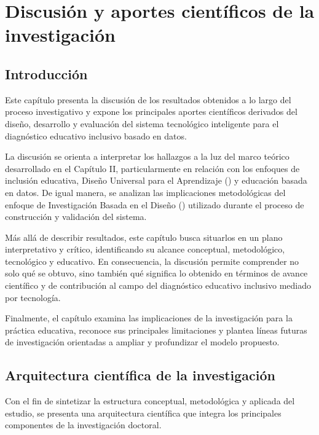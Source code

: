 \chapter{Discusión y aportes científicos de la investigación}

\begin{refsection}

\section{Introducción}

Este capítulo presenta la discusión de los resultados obtenidos a lo largo del proceso investigativo y expone los principales aportes científicos derivados del diseño, desarrollo y evaluación del sistema tecnológico inteligente para el diagnóstico educativo inclusivo basado en datos.

La discusión se orienta a interpretar los hallazgos a la luz del marco teórico desarrollado en el Capítulo II, particularmente en relación con los enfoques de inclusión educativa, Diseño Universal para el Aprendizaje (\DUA) y educación basada en datos. De igual manera, se analizan las implicaciones metodológicas del enfoque de Investigación Basada en el Diseño (\DBR) utilizado durante el proceso de construcción y validación del sistema.

Más allá de describir resultados, este capítulo busca situarlos en un plano interpretativo y crítico, identificando su alcance conceptual, metodológico, tecnológico y educativo. En consecuencia, la discusión permite comprender no solo qué se obtuvo, sino también qué significa lo obtenido en términos de avance científico y de contribución al campo del diagnóstico educativo inclusivo mediado por tecnología.

Finalmente, el capítulo examina las implicaciones de la investigación para la práctica educativa, reconoce sus principales limitaciones y plantea líneas futuras de investigación orientadas a ampliar y profundizar el modelo propuesto.

\section{Arquitectura científica de la investigación}

Con el fin de sintetizar la estructura conceptual, metodológica y aplicada del estudio, se presenta una arquitectura científica que integra los principales componentes de la investigación doctoral.


\end{refsection}

